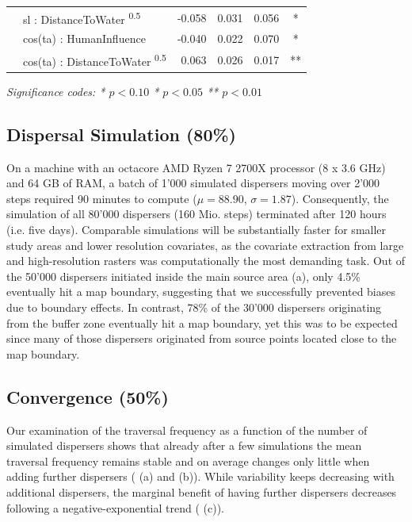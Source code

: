 \documentclass[abstract=on,10pt,a4paper,bibliography=totocnumbered]{article}
\begin{document}
\begin{table}
\begin{center}
{\begin{threeparttable}
\begin{tabular}{llrrrc}
         & sl : DistanceToWater \textsuperscript{0.5} & -0.058 & 0.031 & 0.056 & * \\
         & cos(ta) : HumanInfluence & -0.040 & 0.022 & 0.070 & * \\
         & cos(ta) : DistanceToWater \textsuperscript{0.5} & 0.063 & 0.026 & 0.017 & ** \\
         \bottomrule
      \end{tabular}
       \begin{tablenotes}
         \item \textit{Significance codes: * \(p < 0.10\) \quad ** \(p < 0.05\)
         \quad *** \(p < 0.01\)}
       \end{tablenotes}
    \end{threeparttable}
    }
  \end{center}
\end{table}

\subsection{Dispersal Simulation (80\%)}
On a machine with an octacore AMD Ryzen 7 2700X processor (8 x 3.6 GHz) and 64
GB of RAM, a batch of 1'000 simulated dispersers moving over 2'000 steps
required 90 minutes to compute (\(\mu = 88.90\), \(\sigma = 1.87\)).
Consequently, the simulation of all 80'000 dispersers (160 Mio. steps)
terminated after 120 hours (i.e. five days). Comparable simulations will be
substantially faster for smaller study areas and lower resolution covariates, as
the covariate extraction from large and high-resolution rasters was
computationally the most demanding task. Out of the 50'000 dispersers initiated
inside the main source area (a), only 4.5\% eventually hit a
map boundary, suggesting that we successfully prevented biases due to boundary
effects. In contrast, 78\% of the 30'000 dispersers originating from the buffer
zone eventually hit a map boundary, yet this was to be expected since many of
those dispersers originated from source points located close to the map
boundary.

\subsection{Convergence (50\%)}
Our examination of the traversal frequency as a function of the number of
simulated dispersers shows that already after a few simulations the mean
traversal frequency remains stable and on average changes only little when
adding further dispersers ( (a) and (b)). While variability
keeps decreasing with additional dispersers, the marginal benefit of having
further dispersers decreases following a negative-exponential trend
( (c)).
\end{document}
